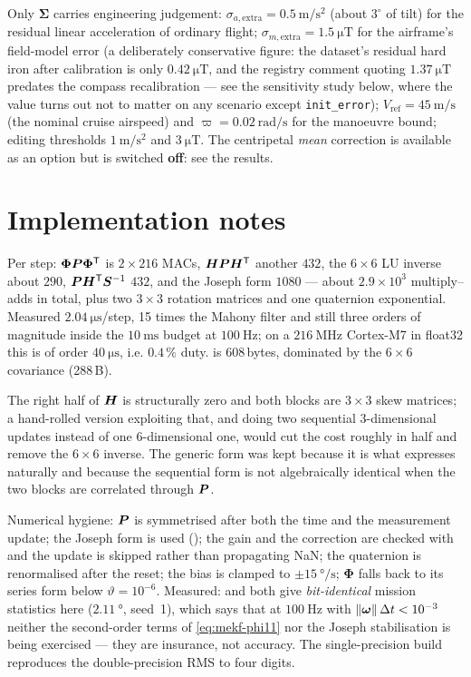 Only $\bm{\Sigma}$ carries engineering judgement:
$\sigma_{a,\text{extra}}=\SI{0.5}{\metre\per\second\squared}$ (about $3^\circ$ of tilt) for the
residual linear acceleration of ordinary flight;
$\sigma_{m,\text{extra}}=\SI{1.5}{\micro\tesla}$ for the airframe's field-model error (a
deliberately conservative figure: the dataset's residual hard iron after calibration is only
$\SI{0.42}{\micro\tesla}$, and the registry comment quoting $\SI{1.37}{\micro\tesla}$ predates the
compass recalibration --- see the sensitivity study below, where the value turns out not to matter
on any scenario except \texttt{init\_error});
$V_{\text{ref}}=\SI{45}{\metre\per\second}$ (the nominal cruise airspeed) and
$\varpi=\SI{0.02}{\radian\per\second}$ for the manoeuvre bound; editing thresholds
$\SI{1}{\metre\per\second\squared}$ and $\SI{3}{\micro\tesla}$. The centripetal \emph{mean}
correction is available as an option but is switched \textbf{off}: see the results.

\section{Implementation notes}
Per step: $\bm{\Phi}\bm{P}\bm{\Phi}^{\mathsf{T}}$ is $2\times216$ MACs, $\bm{H}\bm{P}\bm{H}^{\mathsf{T}}$ another $432$, the
$6\times6$ LU inverse about $290$, $\bm{P}\bm{H}^{\mathsf{T}}\bm{S}^{-1}$ $432$, and the Joseph form $1080$ --- about
$2.9\times10^3$ multiply--adds in total, plus two $3\times3$ rotation matrices and one quaternion
exponential. Measured $\SI{2.04}{\micro\second}$/step, 15 times the Mahony filter and
still three orders of magnitude inside the $\SI{10}{\milli\second}$ budget at $\SI{100}{\hertz}$; on
a $\SI{216}{\mega\hertz}$ Cortex-M7 in float32 this is of order $\SI{40}{\micro\second}$, i.e.
$0.4\,\%$ duty.  is 608\,bytes, dominated by the $6\times6$ covariance (288\,B).

The right half of $\bm{H}$ is structurally zero and both blocks are $3\times3$ skew matrices; a
hand-rolled version exploiting that, and doing two sequential $3$-dimensional updates instead of one
$6$-dimensional one, would cut the cost roughly in half and remove the $6\times6$ inverse. The
generic form was kept because it is what  expresses naturally and because the
sequential form is not algebraically identical when the two blocks are correlated through $\bm{P}$.

Numerical hygiene: $\bm{P}$ is symmetrised after both the time and the measurement update; the Joseph
form is used (); the gain and the correction are checked with 
and the update is skipped rather than propagating NaN; the quaternion is renormalised after the
reset; the bias is clamped to $\pm\SI{15}{\degree\per\second}$; $\bm{\Phi}$ falls back to its series
form below $\vartheta=10^{-6}$. Measured:  and  both give
\emph{bit-identical} mission statistics here ($\SI{2.11}{\degree}$, seed~1), which says that at
$\SI{100}{\hertz}$ with $\left\lVert \bm{\omega} \right\rVert\Delta t<10^{-3}$ neither the second-order terms of
\eqref{eq:mekf-phi11} nor the Joseph stabilisation is being exercised --- they are insurance, not
accuracy. The single-precision build reproduces the double-precision RMS to four digits.

